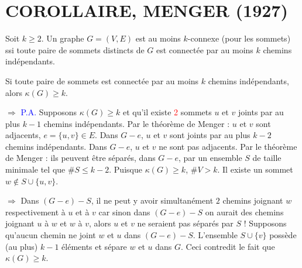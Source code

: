 \section{COROLLAIRE, MENGER (1927)}

Soit $k \geq 2$. Un graphe $G = (V,E)$ est au moins $k$-connexe (pour les sommets) ssi toute paire de sommets distincts de $G$ est connectée par au moins $k$ chemins indépendants.

Si toute paire de sommets est connectée par au moins $k$ chemins indépendants, alors $\kappa(G) \geq k$.

$\Rightarrow$ \textcolor{blue}{P.A.} Supposons $\kappa(G) \geq k$ et qu'il existe \textcolor{red}{2} sommets $u$ et $v$ joints par au plus $k - 1$ chemins indépendants. Par le théorème de Menger : $u$ et $v$ sont adjacents, $e = \{u, v\} \in E$. Dans $G - e$, $u$ et $v$ sont joints par au plus $k - 2$ chemins indépendants. Dans $G - e$, $u$ et $v$ ne sont pas adjacents. Par le théorème de Menger : ils peuvent être séparés, dans $G - e$, par un ensemble $S$ de taille minimale tel que $\#S \leq k - 2$. Puisque $\kappa(G) \geq k$, $\#V > k$. Il existe un sommet $w \notin S \cup \{u, v\}$.

$\Rightarrow$ Dans $(G - e) - S$, il ne peut y avoir simultanément $2$ chemins joignant $w$ respectivement à $u$ et à $v$ car sinon dans $(G - e) - S$ on aurait des chemins joignant $u$ à $w$ et $w$ à $v$, alors $u$ et $v$ ne seraient pas séparés par $S$ ! Supposons qu’aucun chemin ne joint $w$ et $u$ dans $(G - e) - S$. L’ensemble $S \cup \{v\}$ possède (au plus) $k - 1$ éléments et sépare $w$ et $u$ dans $G$. Ceci contredit le fait que $\kappa(G) \geq k$.
